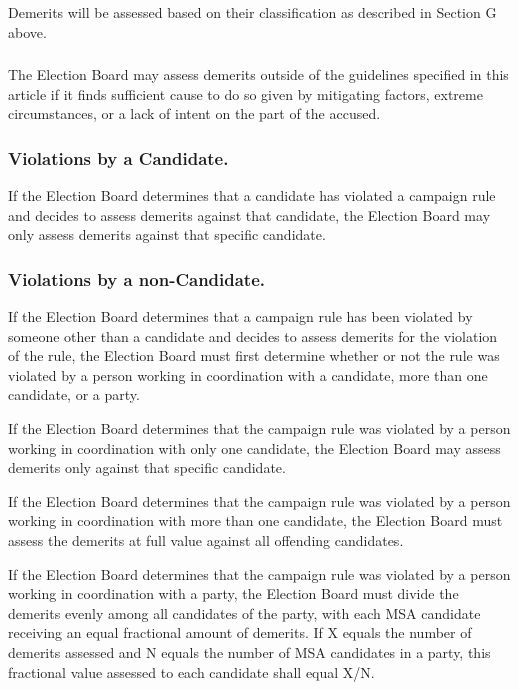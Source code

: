 \subsubsection{}
Demerits will be assessed based on their classification as described in Section G above.

\subsubsection{}
The Election Board may assess demerits outside of the guidelines specified in this article if it finds sufficient cause to do so given by mitigating factors, extreme circumstances, or a lack of intent on the part of the accused.

\subsubsection{Violations by a Candidate.}
If the Election Board determines that a candidate has violated a campaign rule and decides to assess demerits against that candidate, the Election Board may only assess demerits against that specific candidate.

\subsubsection{Violations by a non-Candidate.}

\subsubsubsection{}
If the Election Board determines that a campaign rule has been violated by someone other than a candidate and decides to assess demerits for the violation of the rule, the Election Board must first determine whether or not the rule was violated by a person working in coordination with a candidate, more than one candidate, or a party.

\subsubsubsection{}
If the Election Board determines that the campaign rule was violated by a person working in coordination with only one candidate, the Election Board may assess demerits only against that specific candidate.

\subsubsubsection{}
If the Election Board determines that the campaign rule was violated by a person working in coordination with more than one candidate, the Election Board must assess the demerits at full value against all offending candidates.

\subsubsubsection{}
If the Election Board determines that the campaign rule was violated by a person working in coordination with a party, the Election Board must divide the demerits evenly among all candidates of the party, with each MSA candidate receiving an equal fractional amount of demerits.  If X equals the number of demerits assessed and N equals the number of MSA candidates in a party, this fractional value assessed to each candidate shall equal X/N.


